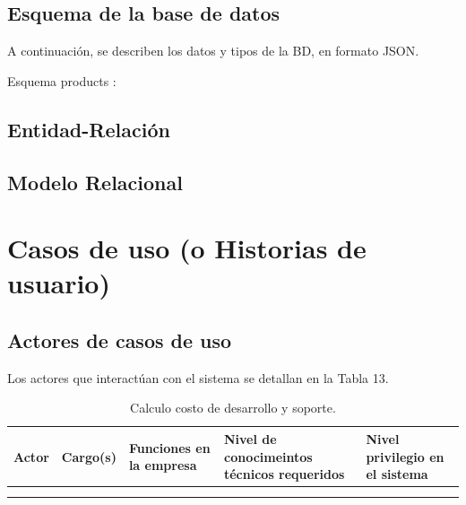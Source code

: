 \subsection{Esquema de la base de datos}

A continuación, se describen los datos y tipos de la BD, en formato JSON.

Esquema products : 


\subsection{Entidad-Relación}
\subsection{Modelo Relacional}


\section{Casos de uso (o Historias de usuario)}
\subsection{Actores de casos de uso}

Los actores que interactúan con el sistema se detallan en la Tabla 13.

\begin{table}[H]
    \begin{center}
        \begin{tabular}{ |m{2cm}|m{2cm}|m{3cm}|m{3cm}|m{3cm}| }
            \hline 
            \textbf{Actor} & \textbf{Cargo(s)} & \textbf{Funciones en la empresa} &
            \textbf{Nivel de conocimeintos técnicos requeridos} & \textbf{Nivel privilegio en el sistema} \\ \hline
              &   &   &   &  \\ \hline
              &   &   &   &  \\ \hline
        \end{tabular}
        \caption{ Calculo costo de desarrollo y soporte.}
    \end{center}
\end{table}

